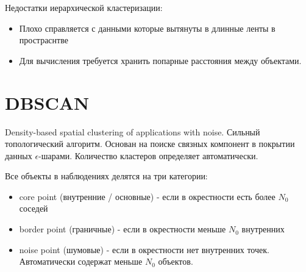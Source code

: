 \documentclass[a4paper, oneside]{book}
\begin{document}
Недостатки иерархической кластеризации:
\begin{itemize}
    \item Плохо справляется с данными которые вытянуты в длинные ленты в
        простраснтве

    \item Для вычисления требуется хранить попарные расстояния между объектами.
\end{itemize}

\section{DBSCAN}
Density-based spatial clustering of applications with noise. Сильный
топологический алгоритм. Основан на поиске связных компонент в покрытии данных
$\epsilon$-шарами. Количество кластеров определяет автоматически.

Все объекты в наблюдениях делятся на три категории:
\begin{itemize}
    \item core point (внутренние / основные) - если в окрестности есть более
        $N_0$ соседей

    \item border point (граничные) - если в окрестности меньше $N_0$ внутренних

    \item noise point (шумовые) - если в окрестности нет внутренних точек.
        Автоматически содержат меньше $N_0$ объектов.
\end{itemize}
\end{document}
